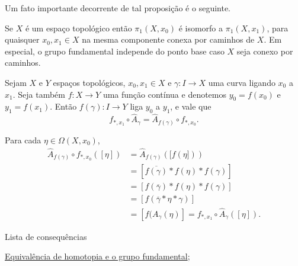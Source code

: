 Um fato importante decorrente de tal proposição é o seguinte.

\begin{corol}
    Se $X$ é um espaço topológico então $\pi_1(X,x_0)$ é isomorfo a $\pi_1(X,x_1)$, para quaisquer $x_0, x_1 \in X$ na mesma componente conexa por caminhos de $X$. Em especial, o grupo fundamental independe do ponto base caso $X$ seja conexo por caminhos.
\end{corol}

\begin{nota}
    Sejam $X$ e $Y$ espaços topológicos, $x_0, x_1\in X$ e $\gamma:I\to X$ uma curva ligando $x_0$ a $x_1$. Seja também $f: X\to Y$ uma função contínua e denotemos $y_0 = f(x_0)$ e $y_1 = f(x_1)$. Então $f(\gamma):I \to Y$ liga $y_0$ a $y_1$, e vale que
    \[f_{*,x_1} \circ \hat{A}_{\gamma} = \hat{A}_{f(\gamma)} \circ f_{*,x_0}.\]
    \begin{dem}
        Para cada $\eta \in \Omega(X,x_0)$,
        \begin{align*}
            \hat{A}_{f(\gamma)} \circ f_{*,x_0}([\eta])
            &= \hat{A}_{f(\gamma)} ([f(\eta]))\\
            &= [\overline{f(\gamma)} * f(\eta) * f(\gamma)]\\
            &= [f(\overline{\gamma}) * f(\eta) * f(\gamma)]\\
            &= [f(\overline{\gamma} * \eta * \gamma)]\\
            &= [f(A_{\gamma}(\eta)]
            = f_{*,x_1}\circ \hat{A}_{\gamma}([\eta]).
        \end{align*}
    \end{dem}
\end{nota}

\begin{titlemize}{Lista de consequências}
	\item \hyperref[equiv-homotopia-induz-iso]{Equivalência de homotopia e o grupo fundamental};\\ %
\end{titlemize}

